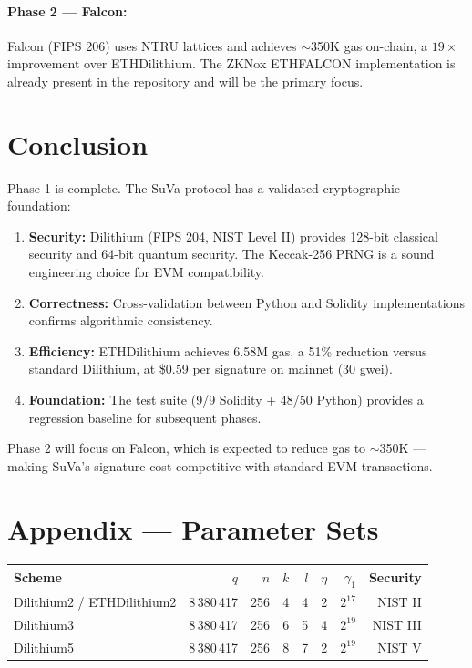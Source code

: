 \documentclass[11pt,a4paper]{article}
\begin{document}
\paragraph{Phase 2 — Falcon:} Falcon (FIPS 206) uses NTRU lattices and achieves $\sim$350K gas on-chain, a $19\times$ improvement over ETHDilithium. The ZKNox ETHFALCON implementation is already present in the repository and will be the primary focus.

\section{Conclusion}

Phase 1 is complete. The SuVa protocol has a validated cryptographic foundation:

\begin{enumerate}
  \item \textbf{Security:} Dilithium (FIPS 204, NIST Level II) provides 128-bit classical security and 64-bit quantum security. The Keccak-256 PRNG is a sound engineering choice for EVM compatibility.
  \item \textbf{Correctness:} Cross-validation between Python and Solidity implementations confirms algorithmic consistency.
  \item \textbf{Efficiency:} ETHDilithium achieves 6.58M gas, a 51\% reduction versus standard Dilithium, at \$0.59 per signature on mainnet (30 gwei).
  \item \textbf{Foundation:} The test suite (9/9 Solidity + 48/50 Python) provides a regression baseline for subsequent phases.
\end{enumerate}

Phase 2 will focus on Falcon, which is expected to reduce gas to $\sim$350K — making SuVa's signature cost competitive with standard EVM transactions.

\appendix
\section{Appendix — Parameter Sets}

\begin{center}
\begin{tabular}{lrrrrrrr}
\toprule
\textbf{Scheme} & $q$ & $n$ & $k$ & $l$ & $\eta$ & $\gamma_1$ & \textbf{Security} \\
\midrule
Dilithium2 / ETHDilithium2 & 8\,380\,417 & 256 & 4 & 4 & 2 & $2^{17}$ & NIST II \\
Dilithium3 & 8\,380\,417 & 256 & 6 & 5 & 4 & $2^{19}$ & NIST III \\
Dilithium5 & 8\,380\,417 & 256 & 8 & 7 & 2 & $2^{19}$ & NIST V \\
\bottomrule
\end{tabular}
\end{center}
\end{document}
